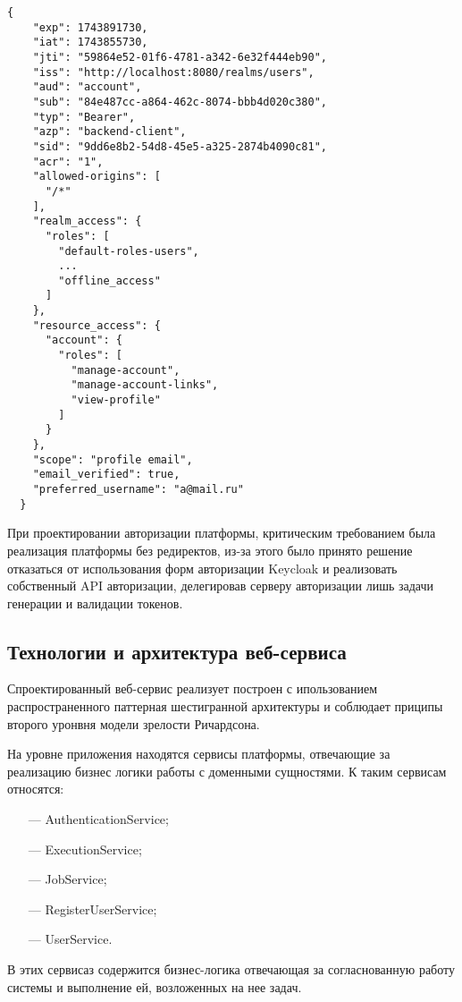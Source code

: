 \begin{lstlisting}[caption={Токен доступа}, label=lst:acces_token]
  {
    "exp": 1743891730,
    "iat": 1743855730,
    "jti": "59864e52-01f6-4781-a342-6e32f444eb90",
    "iss": "http://localhost:8080/realms/users",
    "aud": "account",
    "sub": "84e487cc-a864-462c-8074-bbb4d020c380",
    "typ": "Bearer",
    "azp": "backend-client",
    "sid": "9dd6e8b2-54d8-45e5-a325-2874b4090c81",
    "acr": "1",
    "allowed-origins": [
      "/*"
    ],
    "realm_access": {
      "roles": [
        "default-roles-users",
        ...
        "offline_access"
      ]
    },
    "resource_access": {
      "account": {
        "roles": [
          "manage-account",
          "manage-account-links",
          "view-profile"
        ]
      }
    },
    "scope": "profile email",
    "email_verified": true,
    "preferred_username": "a@mail.ru"
  }
\end{lstlisting}

При проектировании авторизации платформы, критическим требованием была реализация платформы без редиректов, из-за этого было принято решение отказаться от использования форм авторизации Keycloak и реализовать собственный API авторизации, делегировав серверу авторизации лишь задачи генерации и валидации токенов.

\subsection{Технологии и архитектура веб-сервиса}

Спроектированный веб-сервис реализует построен с ипользованием распространенного паттерная шестигранной архитектуры\cite{richardson2023microservices} и соблюдает приципы второго уронвня модели зрелости Ричардсона\cite{salvadori2015maturity}. 

На уровне приложения находятся сервисы платформы, отвечающие за реализацию бизнес логики работы с доменными сущностями. К таким сервисам относятся:

\begin{itemize}
\item[---] AuthenticationService;
\item[---] ExecutionService;
\item[---] JobService;
\item[---] RegisterUserService;
\item[---] UserService.
\end{itemize}

В этих сервисаз содержится бизнес-логика отвечающая за согласнованную работу системы и выполнение ей, возложенных на нее задач.

